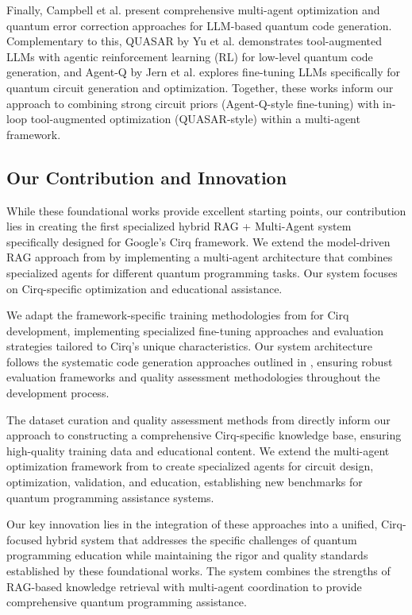 \documentclass[runningheads]{llncs}
\begin{document}
Finally, Campbell et al. \cite{campbell2025enhancingllmbasedquantumcode} present comprehensive multi-agent optimization and quantum error correction approaches for LLM-based quantum code generation. Complementary to this, QUASAR by Yu et al. \cite{yu2025quasarquantumassemblycode} demonstrates tool-augmented LLMs with agentic reinforcement learning (RL) for low-level quantum code generation, and Agent-Q by Jern et al. \cite{jern2025agentqfinetuninglargelanguage} explores fine-tuning LLMs specifically for quantum circuit generation and optimization. Together, these works inform our approach to combining strong circuit priors (Agent-Q-style fine-tuning) with in-loop tool-augmented optimization (QUASAR-style) within a multi-agent framework.

\subsection{Our Contribution and Innovation}
While these foundational works provide excellent starting points, our contribution lies in creating the first specialized hybrid RAG + Multi-Agent system specifically designed for Google's Cirq framework. We extend the model-driven RAG approach from \cite{siavash2025modeldrivenquantumcodegeneration} by implementing a multi-agent architecture that combines specialized agents for different quantum programming tasks. Our system focuses on Cirq-specific optimization and educational assistance.

We adapt the framework-specific training methodologies from \cite{10691762} for Cirq development, implementing specialized fine-tuning approaches and evaluation strategies tailored to Cirq's unique characteristics. Our system architecture follows the systematic code generation approaches outlined in \cite{jimenez2025codegeneration}, ensuring robust evaluation frameworks and quality assessment methodologies throughout the development process.

The dataset curation and quality assessment methods from \cite{basit2025pennylangpioneeringllmbasedquantum} directly inform our approach to constructing a comprehensive Cirq-specific knowledge base, ensuring high-quality training data and educational content. We extend the multi-agent optimization framework from \cite{campbell2025enhancingllmbasedquantumcode} to create specialized agents for circuit design, optimization, validation, and education, establishing new benchmarks for quantum programming assistance systems.

Our key innovation lies in the integration of these approaches into a unified, Cirq-focused hybrid system that addresses the specific challenges of quantum programming education while maintaining the rigor and quality standards established by these foundational works. The system combines the strengths of RAG-based knowledge retrieval with multi-agent coordination to provide comprehensive quantum programming assistance.
\end{document}
